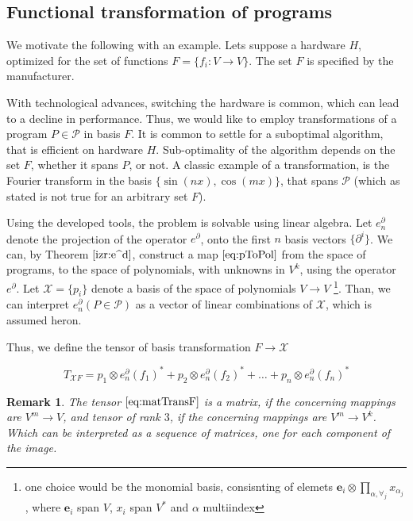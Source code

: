 \documentclass{article}
\newcommand{\e}{\mathbf{e}}
\newcommand{\X}{\mathcal{X}}
\newcommand{\dP}{\mathcal{P}}
\newcommand{\D}{\partial}
\newtheorem{opomba}{Remark}[section]
\begin{document}
   \subsection{Functional transformation of programs}\label{sec:FTP}
   
   We motivate the following with an example. Lets suppose a hardware $H$,
   optimized for the set of functions $F=\{f_i:V\to V\}$. The set $F$ is
   specified by the manufacturer.  
   
   With technological advances, switching the hardware is common, which can lead to a decline in performance. Thus, we would like to employ transformations of a program $P\in\dP$ in basis $F$. It is common to settle for a suboptimal algorithm, that is efficient on hardware $H$. Sub-optimality of the algorithm depends on the set $F$, whether it spans $P$, or not. A classic example of a transformation, is the Fourier transform in the basis $\{\sin(nx), \cos(mx)\}$, that spans $\dP$ (which as stated is not true for an arbitrary set $F$).
   
   Using the developed tools, the problem is solvable using linear algebra. Let
   $e^\D_n$ denote the projection of the operator $e^\D$, onto the first $n$
   basis vectors $\{\D^i\}$. We can, by Theorem $\ref{izr:e^d}$, construct a map
   $\eqref{eq:pToPol}$ from the space of programs, to the space of polynomials,
   with unknowns in $V^k$, using the operator $e^\D$. Let $\X=\{p_i\}$ denote a basis of
   the space of polynomials $V\to V$ \footnote{one choice would be the monomial basis,
   consisnting of elemets $\e_i\otimes\prod\limits_{\alpha,\forall_j}
   x_{\alpha_j}$, where $\e_i$ span $V$, $x_i$ span $V^*$ and $\alpha$
   multiindex}. Than, we can interpret $e^\D_n(P\in\dP)$ as a vector of linear combinations of $\X$, which is assumed heron.
  
  Thus, we define the tensor of basis transformation $F\to\X$
  
  \begin{equation}\label{eq:matTransF}
  T_{\X F}=
  p_1\otimes e_n^\D(f_1)^* + p_2\otimes e_n^\D(f_2)^* + \ldots + p_n\otimes e_n^\D(f_n)^*
  \end{equation}
  
  \begin{opomba}
  The tensor $\eqref{eq:matTransF}$ is a matrix, if the concerning mappings are $V^m\to V$, and tensor of rank $3$, if the concerning mappings are $V^m\to V^k$. Which can be interpreted as a sequence of matrices, one for each component of the image.
  \end{opomba}
  
\end{document}
